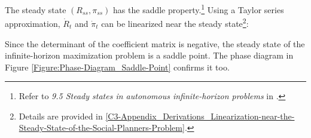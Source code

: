 The steady state $(R_{ss}, \pi_{ss})$ has the saddle property.\footnote{Refer to \textit{9.5 Steady states in autonomous infinite-horizon problems} in \cite{Optimal-Control-Theory-and-Static-Optimization-in-Economics_Leonard-and-Long_1992}.} Using a Taylor series approximation, $\dot{R}_{t}$ and $\dot{\pi}_{t}$ can be linearized near the steady state\footnote{Details are provided in \ref{C3-Appendix_Derivations_Linearization-near-the-Steady-State-of-the-Social-Planners-Problem}.}:

Since the determinant of the coefficient matrix is negative, the steady state of the infinite-horizon maximization problem is a saddle point. The phase diagram in Figure \ref{Figure:Phase-Diagram_Saddle-Point} confirms it too.
